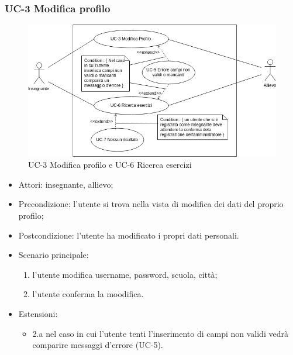 	\subsubsection{UC-3 Modifica profilo}
		\begin{figure}[h]
			\centering
			\includegraphics[scale=0.7]{images/UC-3.png}
			\caption{UC-3 Modifica profilo e UC-6 Ricerca esercizi}
		\end{figure}
		\begin{itemize}
			\item Attori: insegnante, allievo;
			\item Precondizione: l'utente si trova nella vista di modifica dei dati del proprio profilo;
			\item Postcondizione: l'utente ha modificato i propri dati personali.
			\item Scenario principale:
				\begin{enumerate}
					\item l'utente modifica username, password, scuola, città;
					\item l'utente conferma la moodifica.
				\end{enumerate}
				\item Estensioni:
				\begin{itemize}
					\item 2.a nel caso in cui l'utente tenti l'inserimento di campi non validi vedrà comparire messaggi d'errore (UC-5).
				\end{itemize}
		\end{itemize}
